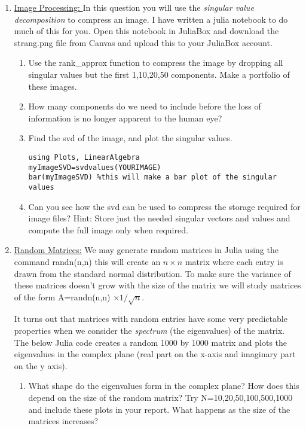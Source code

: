 \documentclass[11pt, a4paper]{article}
\begin{document}
\begin{enumerate}
\item \underline{Image Processing: } 
In this question you will use the \textit{singular value decomposition} to compress an image. I have written a julia notebook to do much of this for you. Open this notebook in JuliaBox and download the strang.png file from Canvas and upload this to your JuliaBox account. 


\begin{enumerate}
\item Use the rank\_approx function to compress the image by dropping all singular values but the first 1,10,20,50 components. Make a portfolio of these images. 
\item How many components do we need to include before the loss of information is no longer apparent to the human eye?
\item Find the svd of the image, and plot the singular values. 
\begin{lstlisting}
using Plots, LinearAlgebra
myImageSVD=svdvalues(YOURIMAGE)
bar(myImageSVD) %this will make a bar plot of the singular values
\end{lstlisting}
\item Can you see how the svd can be used to compress the storage required for image files? Hint: Store just the needed singular vectors and values and compute the full image only when required. 
\end{enumerate}

\item \underline{Random Matrices:} We may generate random matrices in Julia using the command randn(n,n) this will create an $n \times n$ matrix where each entry is drawn from the standard normal distribution. To make sure the variance of these matrices doesn't grow with the size of the matrix we will study matrices of the form A=randn(n,n) $\times 1/\sqrt{n}$. 

It turns out that matrices with random entries have some very predictable properties when we consider the \textit{spectrum} (the eigenvalues) of the matrix. The below Julia code creates a random 1000 by 1000 matrix and plots the eigenvalues in the complex plane (real part on the x-axis and imaginary part on the y axis). 



\begin{enumerate}
\item What shape do the eigenvalues form in the complex plane? How does this depend on the size of the random matrix? Try N=10,20,50,100,500,1000 and include these plots in your report.  What happens as the size of the matrices increases?
\end{enumerate}





\end{enumerate}


\end{document}
